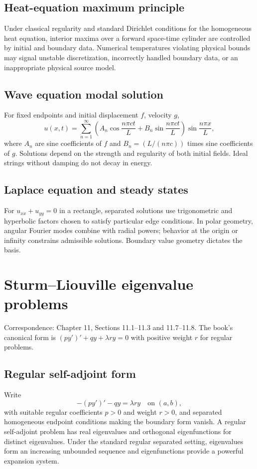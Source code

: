 \documentclass[11pt,letterpaper,oneside]{report}
\theoremstyle{definition}\newtheorem{definition}[theorem]{Definition}
\theoremstyle{remark}\newtheorem{remark}[theorem]{Remark}
\begin{document}
\section{Heat-equation maximum principle}
Under classical regularity and standard Dirichlet conditions for the homogeneous heat equation, interior maxima over a forward space-time cylinder are controlled by initial and boundary data. Numerical temperatures violating physical bounds may signal unstable discretization, incorrectly handled boundary data, or an inappropriate physical source model.
\section{Wave equation modal solution}
For fixed endpoints and initial displacement $f$, velocity $g$,
\[u(x,t)=\sum_{n=1}^{\infty}\left(A_n\cos\frac{n\pi ct}{L}+B_n\sin\frac{n\pi ct}{L}\right)\sin\frac{n\pi x}{L},\]
where $A_n$ are sine coefficients of $f$ and $B_n=(L/(n\pi c))$ times sine coefficients of $g$. Solutions depend on the strength and regularity of both initial fields. Ideal strings without damping do not decay in energy.
\section{Laplace equation and steady states}
For $u_{xx}+u_{yy}=0$ in a rectangle, separated solutions use trigonometric and hyperbolic factors chosen to satisfy particular edge conditions. In polar geometry, angular Fourier modes combine with radial powers; behavior at the origin or infinity constrains admissible solutions. Boundary value geometry dictates the basis.
\chapter{Sturm--Liouville eigenvalue problems}
\begin{bookground}Correspondence: Chapter 11, Sections 11.1--11.3 and 11.7--11.8. The book's canonical form is $(py')'+qy+\lambda r y=0$ with positive weight $r$ for regular problems.\end{bookground}
\section{Regular self-adjoint form}
Write
\[-(p y')'-q y=\lambda r y\quad\text{on }(a,b),\]
with suitable regular coefficients $p>0$ and weight $r>0$, and separated homogeneous endpoint conditions making the boundary form vanish. A regular self-adjoint problem has real eigenvalues and orthogonal eigenfunctions for distinct eigenvalues. Under the standard regular separated setting, eigenvalues form an increasing unbounded sequence and eigenfunctions provide a powerful expansion system.
\end{document}
